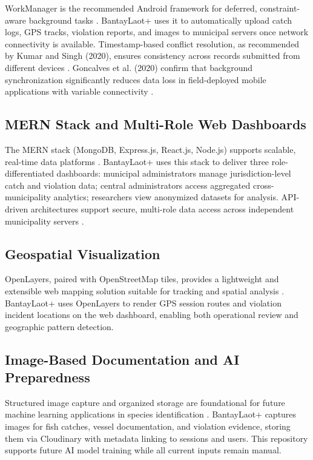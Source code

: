 \documentclass{icsthesis}
\begin{document}
\begin{mainmatter}
WorkManager is the recommended Android framework for deferred, constraint-aware background
tasks \cite{Google2022}. BantayLaot+ uses it to automatically upload catch logs, GPS
tracks, violation reports, and images to municipal servers once network connectivity is
available. Timestamp-based conflict resolution, as recommended by Kumar and
Singh (2020), ensures consistency across records submitted from different devices
\cite{Kumar2020}. Goncalves et al. (2020) confirm that background synchronization
significantly reduces data loss in field-deployed mobile applications with variable
connectivity \cite{Goncalves2020}.

\subsection{MERN Stack and Multi-Role Web Dashboards}

The MERN stack (MongoDB, Express.js, React.js, Node.js) supports scalable, real-time
data platforms \cite{Chodorow2013}. BantayLaot+ uses this stack to deliver three
role-differentiated dashboards: municipal administrators manage jurisdiction-level catch
and violation data; central administrators access aggregated cross-municipality analytics;
researchers view anonymized datasets for analysis. API-driven architectures support
secure, multi-role data access across independent municipality servers \cite{Alzubaidi2020}.

\subsection{Geospatial Visualization}

OpenLayers, paired with OpenStreetMap tiles, provides a lightweight and extensible web
mapping solution suitable for tracking and spatial analysis \cite{Haklay2008}.
BantayLaot+ uses OpenLayers to render GPS session routes and violation incident locations
on the web dashboard, enabling both operational review and geographic pattern detection.

\subsection{Image-Based Documentation and AI Preparedness}

Structured image capture and organized storage are foundational for future machine
learning applications in species identification \cite{Norouzzadeh2018}. BantayLaot+
captures images for fish catches, vessel documentation, and violation evidence, storing
them via Cloudinary with metadata linking to sessions and users. This repository supports
future AI model training while all current inputs remain manual.
				

\end{mainmatter}
\end{document}
